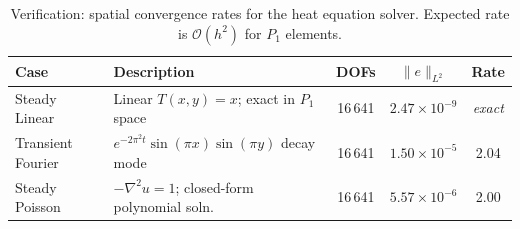 \begin{table}[htbp]
\centering\small
\caption{Verification: spatial convergence rates for the heat equation solver.
         Expected rate is $\mathcal{O}(h^2)$ for $P_1$ elements.}
\label{tab:vv-convergence}
\setlength{\tabcolsep}{4pt}
\begin{tabular}{@{}lp{4.2cm}ccc@{}}
\toprule
Case & Description & DOFs & $\|e\|_{L^2}$ & Rate \\
\midrule
  Steady Linear     & Linear $T(x,y){=}x$; exact in $P_1$ space          & 16\,641 & $2.47{\times}10^{-9}$ & \textit{exact} \\
  Transient Fourier & $e^{-2\pi^2 t}\sin(\pi x)\sin(\pi y)$ decay mode    & 16\,641 & $1.50{\times}10^{-5}$ & 2.04            \\
  Steady Poisson    & $-\nabla^2 u = 1$; closed-form polynomial soln.     & 16\,641 & $5.57{\times}10^{-6}$ & 2.00            \\
\bottomrule
\end{tabular}
\end{table}
